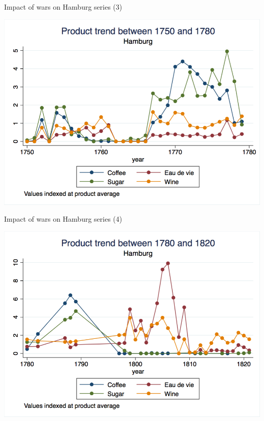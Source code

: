 \documentclass[11pt]{beamer}
\begin{document}
\begin{frame}{Impact of wars on Hamburg series (3)}
\begin{center}
\includegraphics[scale=.3]{hamburg_product_1780.png}
\end{center}
\end{frame}

\begin{frame}{Impact of wars on Hamburg series (4)}
\begin{center}
\includegraphics[scale=.3]{hamburg_product_1820.png}
\end{center}
\end{frame}
\end{document}
